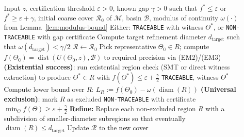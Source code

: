 \documentclass[12pt]{article}
\theoremstyle{definition}
\theoremstyle{plain}
\begin{document}
\begin{algorithm}[H]
\caption{Adaptive Traceability Resolution for input \(z\) with gap \(\gamma>0\)}
\label{alg:adaptive-trace}
\begin{algorithmic}[1]
\Require Input \(z\), certification threshold \(\varepsilon>0\), known gap \(\gamma>0\) such that \(f^*\le \varepsilon\) or \(f^*\ge \varepsilon+\gamma\), initial coarse cover \(\mathcal R_0\) of \(\mathcal M\), basin \(\mathcal B\), modulus of continuity \(\omega(\cdot)\) from Lemma~\ref{lem:modulus-bound}
\Ensure Either: \texttt{TRACEABLE} with witness \(\Theta^*\), or \texttt{NON-TRACEABLE} with gap certificate
\State Compute target refinement diameter \(d_{\mathrm{target}}\) such that \(\omega(d_{\mathrm{target}})<\gamma/2\)
\State \(\mathcal R \gets \mathcal R_0\)
    \State Pick representative \(\Theta_0\in R\); compute \(f(\Theta_0)=\operatorname{dist}(U(\Theta_0,z),\mathcal B)\) to required precision via (EM2)/(EM3)
      \State \textbf{(Existential success)}: run existential region check (SMT or direct witness extraction) to produce \(\Theta^*\in R\) with \(f(\Theta^*)\le \varepsilon + \frac{\gamma}{2}\)
      \State \Return \texttt{TRACEABLE}, witness \(\Theta^*\)
    \EndIf
    \State Compute lower bound over \(R\): \(L_R := f(\Theta_0) - \omega(\operatorname{diam}(R))\)
      \State \textbf{(Universal exclusion)}: mark \(R\) as excluded
    \EndIf
  \EndFor
    \State \Return \texttt{NON-TRACEABLE} with certificate \(\min_{\Theta} f(\Theta) \ge \varepsilon + \frac{\gamma}{2}\)
  \EndIf
  \State \textbf{Refine:} Replace each non-excluded region \(R\) with a subdivision of smaller-diameter subregions so that eventually \(\operatorname{diam}(R)\le d_{\mathrm{target}}\)
  \State Update \(\mathcal R\) to the new cover
\EndWhile
\end{algorithmic}
\end{algorithm}
\end{document}
